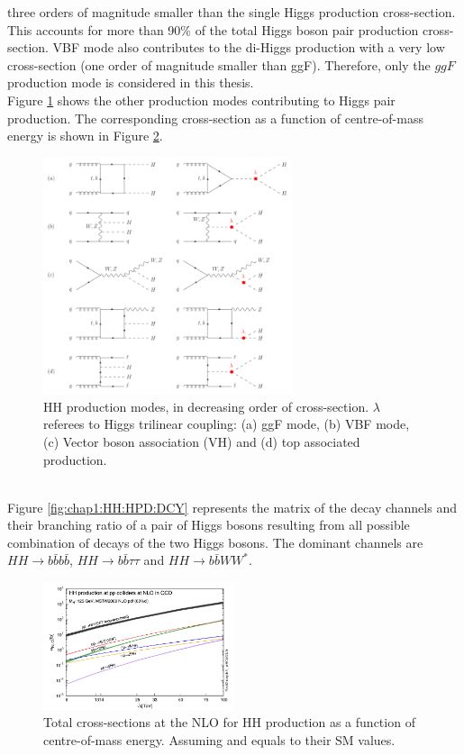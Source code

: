 three orders of magnitude smaller than the single Higgs production cross-section. This accounts for more than 90\% of the total Higgs boson pair production cross-section. VBF mode also contributes to the di-Higgs production with a very low cross-section (one order of magnitude smaller than ggF). Therefore, only the $ggF$ production mode is considered in this thesis. \\
Figure \ref{fig:chap1:HH:HPD:FYS} shows the other production modes contributing to Higgs pair production. The corresponding cross-section as a function of centre-of-mass energy is shown in Figure \ref{fig:chap1:HH:BSM:XSEC:S}.
\begin{figure}[htbp]
    \centering
    \includegraphics[width=0.65\textwidth]{Ch1/Img/HH_feyns.png}
    \caption{HH production modes, in decreasing order of cross-section. $\lambda$ referees to Higgs trilinear coupling: (a) ggF mode, (b) VBF mode, (c) Vector boson association (VH) and (d) top associated production.}
    \label{fig:chap1:HH:HPD:FYS}
\end{figure}
\\
Figure \ref{fig:chap1:HH:HPD:DCY} represents the matrix of the decay channels and their branching ratio of a pair of Higgs bosons resulting from all possible combination of decays of the two Higgs bosons. The dominant channels are $HH\rightarrow b\bar{b}b\bar{b}$, $HH\rightarrow b\bar{b}\tau\tau$ and $HH\rightarrow b\bar{b}WW^*$.
\begin{figure}[htbp]
    \centering
    \includegraphics[width=0.5\textwidth]{Ch1/Img/HH_XSec_as_S.png}
    \caption{Total cross-sections at the NLO for HH production as a function of centre-of-mass energy. Assuming \kl and \kt equals to their SM values.}
    \label{fig:chap1:HH:BSM:XSEC:S}
\end{figure}

